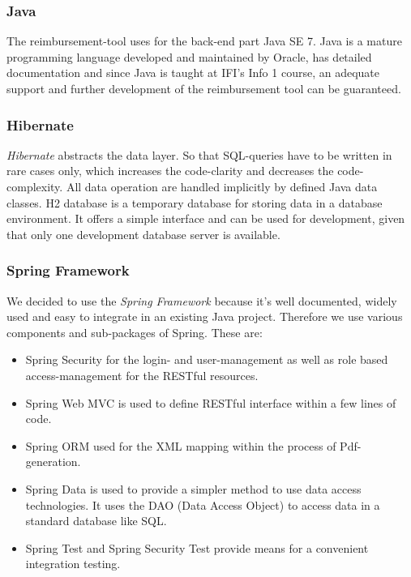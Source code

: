 \subsubsection{Java}
The reimbursement-tool uses for the back-end part Java SE 7. Java is a mature programming language developed and maintained by Oracle\cite{java}, has detailed documentation and since Java is taught at IFI's Info 1 course, an adequate support and further development of the reimbursement tool can be guaranteed.

\subsubsection{Hibernate}
\textit{Hibernate} abstracts the data layer. So that SQL-queries have to be written in rare cases only, which increases the code-clarity and decreases the code-complexity. All data operation are handled implicitly by defined Java data classes.\newline
H2 database is a temporary database for storing data in a database environment. It offers a simple interface and can be used for development, given that only one development database server is available. \cite{hibernate}

\subsubsection{Spring Framework}
We decided to use the \textit{Spring Framework}\cite{spring} because it's well documented, widely used and easy to integrate in an existing Java project. Therefore we use various components and sub-packages of Spring. These are:
\begin{itemize}
	\item Spring Security for the login- and user-management as well as role based access-management for the RESTful resources.
	\item Spring Web MVC is used to define RESTful interface within a few lines of code.
	\item Spring ORM used for the XML mapping within the process of Pdf-generation.
	\item Spring Data is used to provide a simpler method to use data access technologies. It uses the DAO (Data Access Object) \cite{dao} to access data in a standard database like SQL.
	\item Spring Test and Spring Security Test provide means for a convenient integration testing.
\end{itemize}


